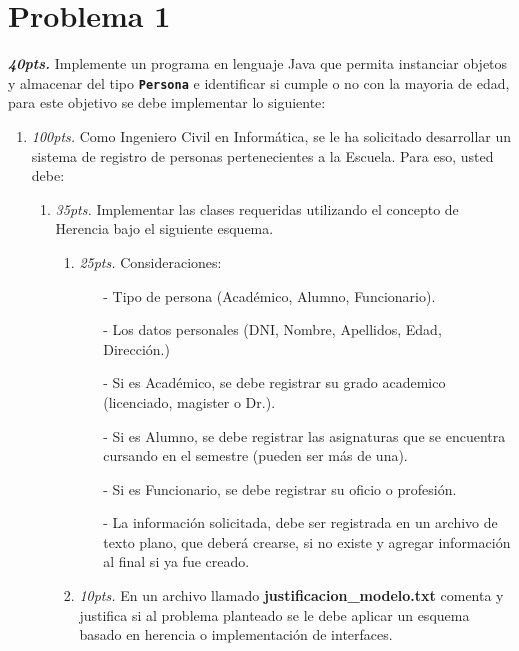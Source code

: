 \documentclass{exam}
\begin{document}
\section{\textbf{Problema 1}}
\noindent
\begin{questions}
\item \textbf{\emph{40pts.}} Implemente un programa en lenguaje Java
  que permita instanciar objetos y almacenar del tipo \texttt{\textbf{Persona}} e
  identificar si cumple o no con la mayoria de edad, para este
  objetivo se debe implementar lo siguiente:

  \begin{enumerate}
    \item \emph{100pts.} Como Ingeniero Civil en Inform\'atica, se le ha solicitado desarrollar un sistema de registro de personas pertenecientes a la Escuela. Para eso, usted debe:
    \begin{enumerate}
        \item \emph{35pts.} Implementar las clases requeridas utilizando el concepto de Herencia bajo el siguiente esquema.
        \begin{enumerate}
          \item \emph{25pts.} Consideraciones:
            \begin{enumerate}
                \item[-] Tipo de persona (Acad\'emico, Alumno, Funcionario).
                \item[-] Los datos personales (DNI, Nombre, Apellidos, Edad, Direcci\'on.)
                \item[-] Si es Acad\'emico, se debe registrar su grado academico (licenciado, magister o Dr.).
                \item[-] Si es Alumno, se debe registrar las asignaturas que se encuentra cursando en el semestre (pueden ser m\'as de una).
                \item[-] Si es Funcionario, se debe registrar su oficio o profesión.
                \item[-] La informaci\'on solicitada, debe ser registrada en un archivo de texto plano, que deber\'a crearse, si no existe y agregar informaci\'on al final si ya fue creado.
            \end{enumerate}
          \item \emph{10pts.}  En un archivo llamado \textbf{justificacion\_modelo.txt} comenta y justifica si al problema planteado se le debe aplicar un esquema basado en herencia o implementación de interfaces.



\end{enumerate}
\end{enumerate}
\end{enumerate}
\end{questions}
\end{document}
